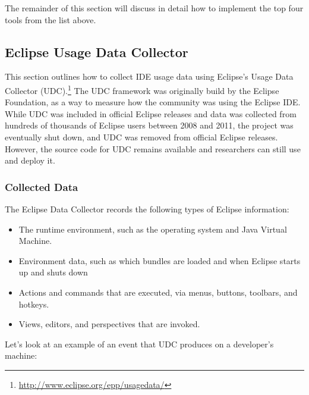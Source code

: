 
The remainder of this section will discuss in detail how to implement the top four tools from the list above.

\subsection{Eclipse Usage Data Collector}
\label{EclipseUsageDataCollector}
This section outlines how to collect IDE usage data using Eclipse's Usage Data
Collector (UDC).\footnote{\url{http://www.eclipse.org/epp/usagedata/}}
The UDC framework was originally build by the Eclipse Foundation, as a way to measure how the
community was using the Eclipse IDE.
While UDC was included in official Eclipse releases and data was collected from
hundreds of thousands of Eclipse users between 2008 and 2011, the project was eventually shut down,
and UDC was removed from official Eclipse releases.
However, the source code for UDC remains available and researchers can still use and deploy it.

\subsubsection{Collected Data}

The Eclipse Data Collector records the following types of Eclipse information:

\begin{itemize}

\item The runtime environment, such as the operating system and Java Virtual Machine.

\item Environment data, such as which bundles are loaded and when Eclipse
starts up and shuts down

\item Actions and commands that are executed, via menus, buttons, toolbars, and hotkeys.

\item Views, editors, and perspectives that are invoked.

\end{itemize}

\noindent
Let's look at an example of an event that UDC produces on a developer's machine:
\vspace{4mm}

